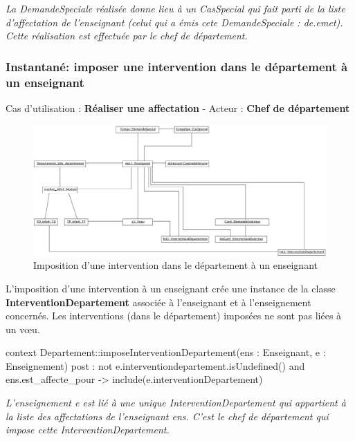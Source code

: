  \emph{La DemandeSpeciale réalisée donne lieu à un CasSpecial qui fait parti de la liste d'affectation de l'enseignant (celui qui a émis cete DemandeSpeciale : de.emet). Cette réalisation est effectuée par le chef de département.}

 \subsubsection{Instantané: imposer une intervention dans le département à un enseignant}
 \indent Cas d'utilisation : \textbf{Réaliser une affectation} - Acteur : \textbf{Chef de département}

 \begin{figure}[!htbp]
 \begin{center}
 \includegraphics[width=14cm]{fig/9-ImpositionVoeu.jpg}
 \caption{Imposition d'une intervention dans le département à un enseignant}
 \end{center}
 \end{figure}

 \indent L'imposition d'une intervention à un enseignant crée une instance de la classe \textbf{InterventionDepartement} associée à l'enseignant et à l'enseignement concernés. Les interventions (dans le département) imposées ne sont pas liées à un v\oe u.

 \begin{ocl}
 context Departement::imposeInterventionDepartement(ens : Enseignant, e : Enseignement)
 post : not e.interventiondepartement.isUndefined()
        and ens.est_affecte_pour -> include(e.interventionDepartement)
 \end{ocl}
 
 \emph{L'enseignement e est lié à une unique InterventionDepartement qui appartient à la liste des affectations de l'enseignant ens. C'est le chef de département qui impose cette InterventionDepartement.}


